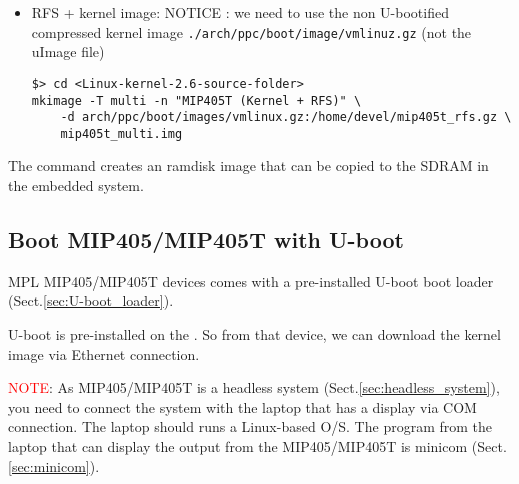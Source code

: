 \begin{enumerate}
\begin{itemize}
\begin{verbatim}
\end{verbatim}

  \item RFS + kernel image: NOTICE : we need to use the non U-bootified compressed 
  kernel image \verb!./arch/ppc/boot/image/vmlinuz.gz! (not the uImage file)
  
\begin{verbatim}
$> cd <Linux-kernel-2.6-source-folder>
mkimage -T multi -n "MIP405T (Kernel + RFS)" \
    -d arch/ppc/boot/images/vmlinux.gz:/home/devel/mip405t_rfs.gz \ 
    mip405t_multi.img
\end{verbatim}  
\end{itemize}
The command creates an ramdisk image that can be copied to the SDRAM in the
embedded system.

  
  
  
  
\end{enumerate}  
% 






\subsection{Boot MIP405/MIP405T with U-boot}
\label{sec:Uboot_MIP405/MIP405T}

MPL MIP405/MIP405T devices comes with a pre-installed U-boot boot loader
(Sect.\ref{sec:U-boot_loader}).

U-boot is pre-installed on the . So
from that device, we can download the kernel image via Ethernet connection.

\textcolor{red}{NOTE}: As MIP405/MIP405T is a headless system
(Sect.\ref{sec:headless_system}), you need to connect the system with the laptop
that has a display via COM connection. The laptop should runs a Linux-based
O/S. The program from the laptop that can display the output from the
MIP405/MIP405T is minicom (Sect.\ref{sec:minicom}).

